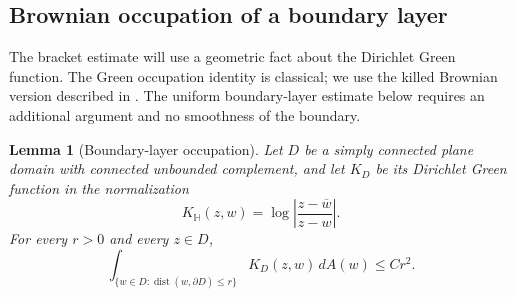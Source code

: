 \documentclass[11pt]{article}
\newtheorem{lemma}[theorem]{Lemma}
\theoremstyle{definition}
\theoremstyle{remark}
\numberwithin{equation}{section}
\begin{document}
\subsection{Brownian occupation of a boundary layer}

The bracket estimate will use a geometric fact about the Dirichlet
Green function.  The Green occupation identity is classical; we use
the killed Brownian version described in
\cite[\S3.3, Definitions~3.28 and~3.31 and Theorem~3.32, pp.~78--80]{mortersperes2010}.  The uniform boundary-layer
estimate below requires an additional argument and no smoothness of
the boundary.

\begin{lemma}[Boundary-layer occupation]\label{mesh:layer}
Let $D$ be a simply connected plane domain with connected unbounded
complement, and let $K_D$ be its Dirichlet Green function in the
normalization
\[
 K_{\mathbb H}(z,w)=\log\left|\frac{z-\overline w}{z-w}\right|.
\]
For every $r>0$ and every $z\in D$,
\begin{equation}
 \int_{\{w\in D:\operatorname{dist}(w,\partial D)\le r\}}
 K_D(z,w)\,dA(w)\le Cr^2.
 \label{mesh:layer-bound}
\end{equation}
\end{lemma}
\end{document}
